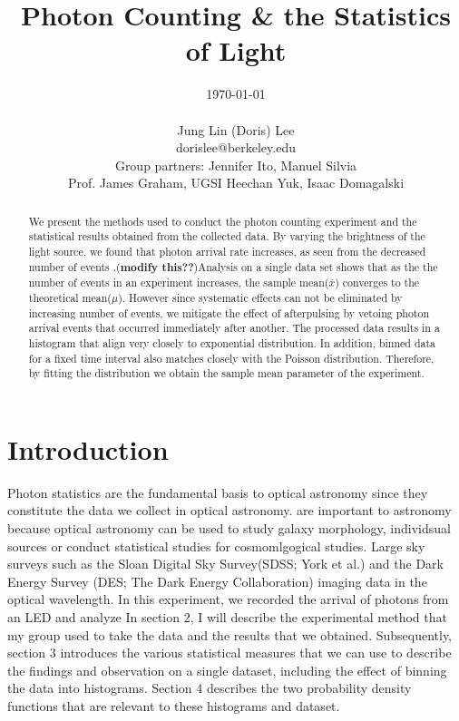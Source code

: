 \documentclass[authoryear, 12pt,5p, times]{elsarticle}
\begin{document}
\begin{frontmatter}
\title{Photon Counting \& the Statistics of Light}
\author{\today \\ \quad \\Jung Lin (Doris) Lee\\ dorislee@berkeley.edu\\Group partners: Jennifer Ito, Manuel Silvia\\Prof. James Graham, UGSI Heechan Yuk, Isaac Domagalski}
	\begin{abstract}
	 We present the methods used to conduct the photon counting experiment and the statistical results obtained from the collected data. By varying the brightness of the light source, we found that photon arrival rate increases, as seen from the decreased number of events .(\textbf{modify this??})Analysis on a single data set shows that as the the number of events in an experiment increases, the sample mean($\bar{x}$) converges to the theoretical mean($\mu$). However since systematic effects can not be eliminated by increasing number of events, we mitigate the effect of afterpulsing by vetoing photon arrival events that occurred immediately after another. The processed data results in a histogram that align very closely to exponential distribution. In addition, binned data for a fixed time interval also matches closely with the Poisson distribution. Therefore, by fitting the distribution we obtain the sample mean parameter of the experiment.  
	\end{abstract}
\end{frontmatter}


\section{Introduction\label{intro}}
\indent Photon statistics are the fundamental basis to optical astronomy since they constitute the data we collect in optical astronomy. 
are important to astronomy because 
optical astronomy 
can be used to study galaxy morphology, individsual sources or conduct statistical studies for cosmomlgogical studies.
Large sky surveys such as the Sloan Digital Sky Survey(SDSS; York et al.) and the Dark Energy Survey (DES; The Dark Energy Collaboration) imaging data in the optical wavelength.
\indent In this experiment, we recorded the arrival of photons from an LED and analyze
 In section 2, I will describe the experimental method that my group used to take the data and the results that we obtained. Subsequently, section 3 introduces the various statistical measures that we can use to describe the findings and observation on  a single dataset, including the effect of binning the data into histograms. Section 4 describes the two probability density functions that are relevant to these histograms and dataset.
\end{document}
